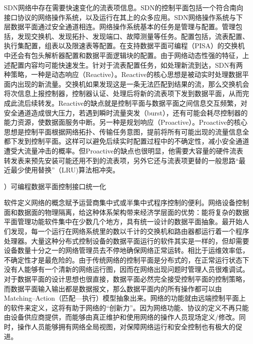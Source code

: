 SDN网络中存在需要快速变化的流表项信息。SDN的控制平面包括一个符合南向接口协议的网络操作系统，以及运行在其上的众多应用。SDN网络操作系统与下层数据平面通过安全通道相连。网络操作系统基本的任务是管理与配置。管理包括，发现交换机、发现拓扑、发现端口、故障测量等任务。配置包括，流表配置、执行集配置，组表以及限速表等配置。在支持数据平面可编程（PISA）的交换机中还会有包头解析器配置和数据平面逻辑块的配置。由于网络动态性强的特征，上述配置内容均可能快速发生。针对于流表配置任务，如处理新流到达，SDN有两种策略，一种是动态响应（Reactive）。Reactive的核心思想是被动实时处理数据平面内出现的新流量。交换机如果发现这是一条无法匹配到结果的流，那么交换机会将次信息上报控制器，控制器认证、处理后将新的流表项下发到数据平面，从而完成此流后续转发。Reactive的缺点就是控制平面与数据平面之间信息交互频繁，对安全通道造成很大压力，若遇到瞬时流量突发（burst），还有可能会耗尽控制器的能力资源，使数据面服务中断。另一种是规划响应（Proactive）。Proactive的核心思想是控制平面根据网络拓扑、传输任务意图，提前将所有可能出现的流量信息全都下发到控制平面。这样可以避免后续实时配置过程中的不确定性，减小安全通道遭受大流量冲击的概率。但Proactive的缺点也很明显，他需要大容量的硬件流表转发表来预先安装可能还用不到的流表项，另外它还与流表项更替的一般思路“最近最少使用替换”（LRU)算法相冲突。

{）可编程数据平面控制接口统一化}


软件定义网络的概念赋予运营商集中式或半集中式程序控制的便利。网络设备控制面和数据面的物理隔离，给这种体系架构带来经济学层面的优势：能将复杂的数据平面管理功能软件集中在少数几个地方，具有统一设计的数据平面抽象。最开始人们发现，每一个运行在网络系统里的数以千计的交换机和路由器都运行着一个程序处理器。大量这种分布式控制设备的数据平面运行的软件其实是一样的，但却需要设备数量十分之一的网络管理员去不停地确保网络正常运转。相比于运维效率低，不确定性才是最危险的。由于传统网络的控制平面是分布式的，在正常运行状态下没有人能够有一个清新的网络运行图，因而在网络出现问题时管理人员很难调试。对于数据平面的设计思想也很直接，数据平面必然完全接受控制平面的控制策略，而数据平面输入输出都是数据报文，那么数据平面内的所有操作都可以由Matching--Action（匹配---执行）模型抽象出来。网络的功能就由远端控制平面上的软件来定义，这将有助于网络的“创新力”。因为网络功能、协议的定义不再只能由设备供应商提供，而能够由真正维护和使用网络的操作人员现场定义/修改。同时，操作人员能够拥有网络全局视图，对保障网络运行和安全控制也有极大的促进。


